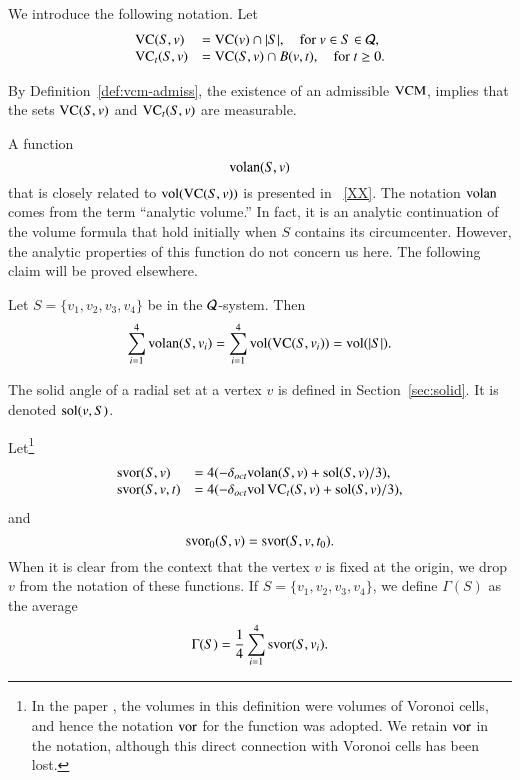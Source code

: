 \begin{definition}  We introduce the following notation.  Let
    $$
    \begin{array}{lll}
        {\operatorname{VC}}(S,v) &= {\operatorname{VC}}(v)\cap |S|,\quad \text{for } v\in
        S\in{\mathcal Q},\\
        {\operatorname{VC}}_t(S,v) &= {\operatorname{VC}}(S,v)\cap B(v,t),\quad\text{for } t\ge
        0.
    \end{array}
    $$
\end{definition}

By Definition~\ref{def:vcm-admiss}, the existence of an admissible
${\operatorname{VCM}}$, implies that the sets ${\operatorname{VC}}(S,v)$ and
${\operatorname{VC}}_t(S,v)$ are measurable.

A function
    $$
    {\operatorname{volan}}(S,v)
    $$ that is closely related to ${\operatorname{vol}}({\operatorname{VC}}(S,v))$ is presented in
\Chap~\ref{XX}.  The notation ${\operatorname{volan}}$
comes from the term ``analytic volume.''  In fact, it is an
analytic continuation of the volume formula that hold initially
when $S$ contains its circumcenter.  However, the analytic
properties of this function do not concern us here.  The following
claim will be proved elsewhere.

\begin{claim}\label{claim:volan} Let $S=\{v_1,v_2,v_3,v_4\}$ be in
the ${\mathcal Q}$-system. Then
    $$
    \sum_{i=1}^4 {\operatorname{volan}}(S,v_i) = \sum_{i=1}^4
    {\operatorname{vol}}({\operatorname{VC}}(S,v_i)) = {\operatorname{vol}}(|S|).
    $$
\end{claim}

The solid angle of a radial set at a vertex $v$ is defined in
Section~\ref{sec:solid}.  It is denoted $\operatorname{sol}(v,S)$.


\begin{definition}\label{def:svor}
Let\footnote{In the paper \cite{spp}, the volumes in this
definition were volumes of Voronoi cells, and hence the notation
$\operatorname{vor}$ for the function was adopted. We retain $\operatorname{vor}$ in the
notation, although this direct connection with Voronoi cells has
been lost.}
      $$
      \begin{array}{lll}
      \operatorname{svor}(S,v) &= 4(-\delta_{oct} {\operatorname{volan}}(S,v)
         +\operatorname{sol}(S,v)/3),\\
      \operatorname{svor}(S,v,t) &= 4(-\delta_{oct} {\operatorname{vol}}\,{\operatorname{VC}}_{t}(S,v)
         +\operatorname{sol}(S,v)/3),
      \end{array}$$
   and
      $$
      \operatorname{svor}_0(S,v) = \operatorname{svor}(S,v,t_0).
      $$
   When it is clear from the context that the vertex $v$ is
   fixed at the origin, we drop $v$ from the notation of these
   functions.
   If $S=\{v_1,v_2,v_3,v_4\}$, we define $\Gamma(S)$ as the average
   \begin{equation}
   \Gamma(S) = \frac{1}{4}\sum_{i=1}^4\operatorname{svor}(S,v_i).
   \label{eqn:gamma}
   \end{equation}
%
\end{definition}

